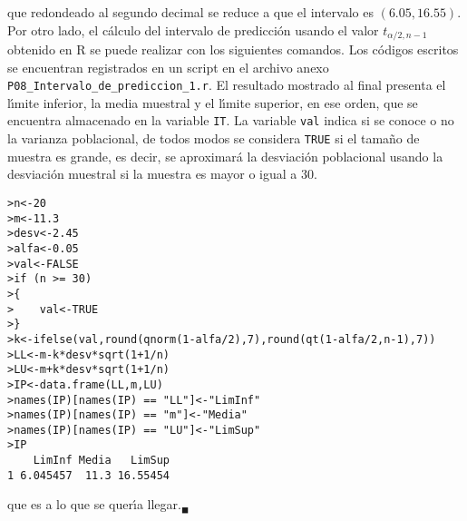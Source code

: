 \begin{solucion}
 que redondeado al segundo decimal se reduce a que el intervalo es $(6.05, 16.55)$. Por otro lado, el c\'alculo del intervalo de predicci\'on usando el valor $t_{\alpha/2, n-1}$ obtenido en R se puede realizar con los siguientes comandos. Los c\'odigos escritos se encuentran registrados en un script en el archivo anexo \texttt{P08\_Intervalo\_de\_prediccion\_1.r}. El resultado mostrado al final presenta el l\'{\i}mite inferior, la media muestral y el l\'{\i}mite superior, en ese orden, que se encuentra almacenado en la variable \texttt{IT}. La variable \texttt{val} indica si se conoce o no la varianza poblacional, de todos modos se considera \texttt{TRUE} si el tama\~no de muestra es grande, es decir, se aproximar\'a la desviaci\'on poblacional usando la desviaci\'on muestral si la muestra es mayor o igual a $30$.
 
 \begin{verbatim}
>n<-20
>m<-11.3
>desv<-2.45
>alfa<-0.05
>val<-FALSE
>if (n >= 30)
>{
>    val<-TRUE
>}
>k<-ifelse(val,round(qnorm(1-alfa/2),7),round(qt(1-alfa/2,n-1),7))
>LL<-m-k*desv*sqrt(1+1/n)
>LU<-m+k*desv*sqrt(1+1/n)
>IP<-data.frame(LL,m,LU)
>names(IP)[names(IP) == "LL"]<-"LimInf"
>names(IP)[names(IP) == "m"]<-"Media"
>names(IP)[names(IP) == "LU"]<-"LimSup"
>IP
    LimInf Media   LimSup
1 6.045457  11.3 16.55454
 \end{verbatim}
 que es a lo que se quer\'{\i}a llegar.${}_{\blacksquare}$
\end{solucion}
